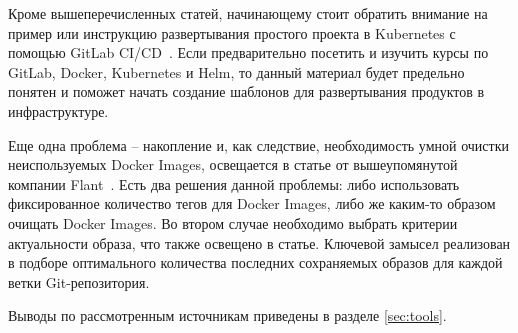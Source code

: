 Кроме вышеперечисленных статей, начинающему стоит обратить внимание на пример или инструкцию развертывания простого проекта в Kubernetes с помощью GitLab CI/CD~\cite{habr:flant:k8s-helm-gitlab-sample}. Если предварительно посетить и изучить курсы по GitLab, Docker, Kubernetes и Helm, то данный материал будет предельно понятен и поможет начать создание шаблонов для развертывания продуктов в инфраструктуре.

Еще одна проблема -- накопление и, как следствие, необходимость умной очистки неиспользуемых Docker Images, освещается в статье от вышеупомянутой компании Flant~\cite{habr:flant:docker-stackoverflow}. Есть два решения данной проблемы: либо использовать фиксированное количество тегов для Docker Images, либо же каким-то образом очищать Docker Images. Во втором случае необходимо выбрать критерии актуальности образа, что также освещено в статье. Ключевой замысел реализован в подборе оптимального количества последних сохраняемых образов для каждой ветки Git-репозитория.

Выводы по рассмотренным источникам приведены в разделе \ref{sec:tools}.
